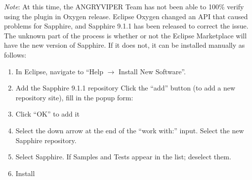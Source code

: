 \begin{appendices}
\textit{Note}: At this time, the ANGRYVIPER Team has not been able to 100\% verify using the plugin in Oxygen release. Eclipse Oxygen changed an API that caused problems for Sapphire, and Sapphire 9.1.1 has been released to correct the issue. The unknown part of the process is whether or not the Eclipse Marketplace will have the new version of Sapphire. If it does not, it can be installed manually as follows:
\begin{enumerate}
\item In Eclipse, navigate to ``Help $\rightarrow$ Install New Software''.
\item Add the Sapphire 9.1.1 repository
\subitem Click the ``add'' button (to add a new repository site), fill in the popup form:
\subitem {}
\subitem {}
\item Click ``OK'' to add it
\item Select the down arrow at the end of the ``work with:'' input. Select the new Sapphire repository.
\item Select Sapphire. If Samples and Tests appear in the list; deselect them.
\item Install
\end{enumerate}

\end{appendices}

